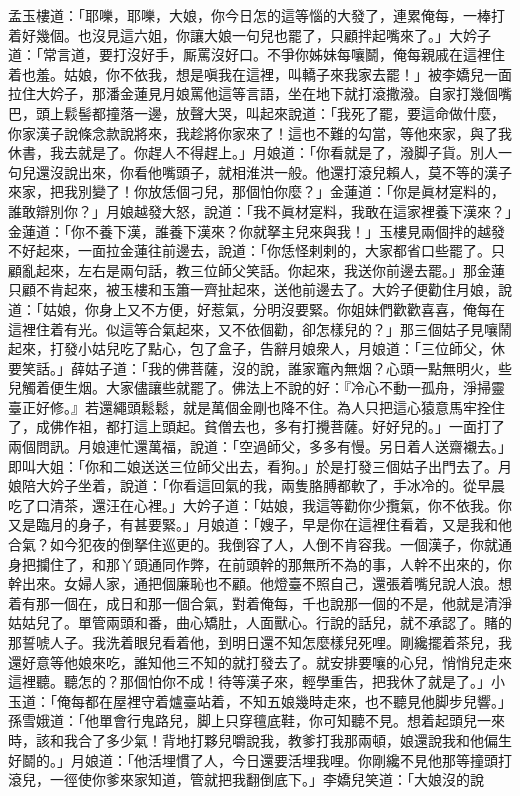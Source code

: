 {}孟玉樓道：「耶嚛，耶嚛，大娘，你今日怎的這等惱的大發了，連累俺每，一棒打着好幾個。也沒見這六姐，你讓大娘一句兒也罷了，只顧拌起嘴來了。」大妗子道：「常言道，要打沒好手，厮罵沒好口。不爭你姊妹每嚷鬬，俺每親戚在這裡住着也羞。姑娘，你不依我，想是嗔我在這裡，叫轎子來我家去罷！」被李嬌兒一面拉住大妗子，那潘金蓮見月娘罵他這等言語，坐在地下就打滾撒潑。{}自家打幾個嘴巴，{}頭上鬏髻都撞落一邊，放聲大哭，叫起來說道：「我死了罷，要這命做什麼，你家漢子說條念款說將來，我趁將你家來了！這也不難的勾當，等他來家，與了我休書，我去就是了。你趕人不得趕上。」月娘道：「你看就是了，潑脚子貨。別人一句兒還沒說出來，你看他嘴頭子，就相淮洪一般。他還打滾兒賴人，莫不等的漢子來家，把我別變了！你放恁個刁兒，那個怕你麼？」金蓮道：「你是眞材寔料的，誰敢辯別你？」月娘越發大怒，說道：「我不眞材寔料，我敢在這家裡養下漢來？」{}金蓮道：「你不養下漢，誰養下漢來？你就拏主兒來與我！」{}玉樓見兩個拌的越發不好起來，一面拉金蓮往前邊去，說道：「你恁怪剌剌的，大家都省口些罷了。只顧亂起來，左右是兩句話，教三位師父笑話。你起來，我送你前邊去罷。」那金蓮只顧不肯起來，被玉樓和玉簫一齊扯起來，送他前邊去了。大妗子便勸住月娘，說道：「姑娘，你身上又不方便，好惹氣，分明沒要緊。你姐妹們歡歡喜喜，俺每在這裡住着有光。似這等合氣起來，又不依個勸，卻怎樣兒的？」那三個姑子見嚷鬧起來，打發小姑兒吃了點心，包了盒子，告辭月娘衆人，月娘道：「三位師父，休要笑話。」薛姑子道：「我的佛菩薩，沒的說，誰家竈內無烟？心頭一點無明火，些兒觸着便生烟。大家儘讓些就罷了。{}佛法上不說的好：『冷心不動一孤舟，淨掃靈臺正好修。』若還繩頭鬆鬆，就是萬個金剛也降不住。為人只把這心猿意馬牢拴住了，成佛作祖，都打這上頭起。{}貧僧去也，多有打攪菩薩。好好兒的。」一面打了兩個問訊。月娘連忙還萬福，說道：「空過師父，多多有慢。另日着人送齋襯去。」即叫大姐：「你和二娘送送三位師父出去，看狗。」於是打發三個姑子出門去了。月娘陪大妗子坐着，說道：「你看這回氣的我，兩隻胳膊都軟了，手冰冷的。從早晨吃了口清茶，還汪在心裡。」大妗子道：「姑娘，我這等勸你少攬氣，你不依我。你又是臨月的身子，有甚要緊。」月娘道：「嫂子，早是你在這裡住看着，又是我和他合氣？如今犯夜的倒拏住巡更的。我倒容了人，人倒不肯容我。{}一個漢子，你就通身把攔住了，和那丫頭通同作弊，在前頭幹的那無所不為的事，人幹不出來的，你幹出來。女婦人家，通把個廉恥也不顧。他燈臺不照自己，還張着嘴兒說人浪。想着有那一個在，成日和那一個合氣，對着俺每，千也說那一個的不是，他就是清淨姑姑兒了。單管兩頭和番，曲心矯肚，人面獸心。行說的話兒，就不承認了。賭的那誓唬人子。我洗着眼兒看着他，到明日還不知怎麼樣兒死哩。剛纔擺着茶兒，我還好意等他娘來吃，誰知他三不知的就打發去了。就安排要嚷的心兒，悄悄兒走來這裡聽。聽怎的？那個怕你不成！待等漢子來，輕學重告，把我休了就是了。」小玉道：「俺每都在屋裡守着爐臺站着，不知五娘幾時走來，也不聽見他脚步兒響。」孫雪娥道：「他單會行鬼路兒，脚上只穿氊底鞋，你可知聽不見。想着起頭兒一來時，該和我合了多少氣！背地打夥兒嚼說我，教爹打我那兩頓，娘還說我和他偏生好鬬的。」{}月娘道：「他活埋慣了人，今日還要活埋我哩。你剛纔不見他那等撞頭打滾兒，一徑使你爹來家知道，管就把我翻倒底下。」李嬌兒笑道：「大娘沒的說